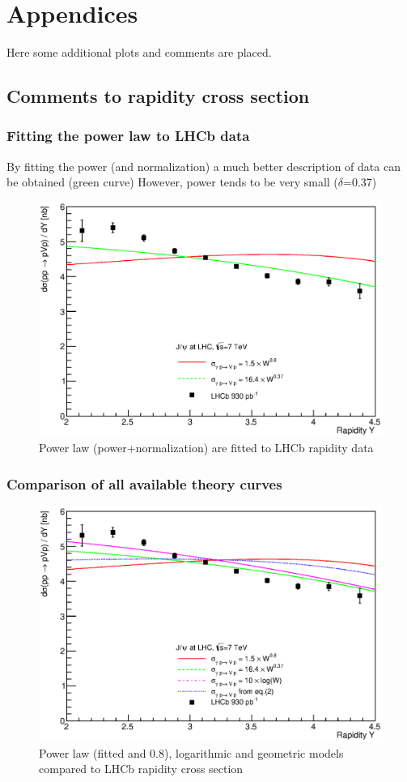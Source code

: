 \documentclass[12pt]{article}
\begin{document}
\newpage
\section{Appendices}
Here some additional plots and comments are placed.

\subsection{Comments to rapidity cross section}

\subsubsection{Fitting the power law to LHCb data}

By fitting the power (and normalization)
a much better description of data can be
obtained (green curve)
However, power tends to be very small ($\delta$=0.37)
\begin{figure}[!h]
\centering
 \includegraphics[width=.8\textwidth]{figures/dSigma_dy_comparison2.eps}
 \caption{Power law (power+normalization) are fitted to LHCb rapidity data}
\end{figure}

\clearpage
\subsubsection{Comparison of all available theory curves}
\begin{figure}[!h]
\centering
 \includegraphics[width=.8\textwidth]{figures/dSigma_dy_comparison3.eps}
 \caption{Power law (fitted and 0.8), logarithmic and geometric models compared to LHCb rapidity cross section}
\end{figure}
\end{document}
